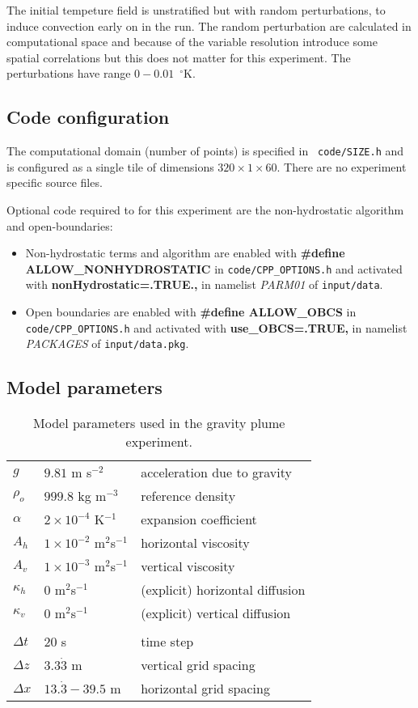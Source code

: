 The initial tempeture field is unstratified but with random
perturbations, to induce convection early on in the run. The random
perturbation are calculated in computational space and because of the
variable resolution introduce some spatial correlations but this does
not matter for this experiment. The perturbations have range
$0-0.01$~$^{\circ}\mathrm{K}$.

\subsection{Code configuration}
\label{www:tutorials}
\label{sect:plume-config}

The computational domain (number of points) is specified in {\tt
code/SIZE.h} and is configured as a single tile of dimensions
$320\times1\times60$. There are no experiment specific source files.

Optional code required to for this experiment are the non-hydrostatic
algorithm and open-boundaries:
\begin{itemize}
\item Non-hydrostatic terms and algorithm are enabled with {\bf
\#define ALLOW\_NONHYDROSTATIC} in {\tt code/CPP\_OPTIONS.h} and
activated with {\bf nonHydrostatic=.TRUE.,} in namelist {\em PARM01}
of {\tt input/data}.
\item Open boundaries are enabled with {\bf \#define ALLOW\_OBCS} in
{\tt code/CPP\_OPTIONS.h} and activated with {\bf use\_OBCS=.TRUE,} in
namelist {\em PACKAGES} of {\tt input/data.pkg}.
\end{itemize}

\subsection{Model parameters}
\label{www:tutorials}
\label{sect:plume-params}

\begin{table}
\begin{center}
\begin{tabular}{lll}
$g$ & $9.81$ m s$^{-2}$ & acceleration due to gravity \\
$\rho_o$ & $999.8$ kg m$^{-3}$ & reference density \\
$\alpha$ & $2 \times 10^{-4}$ K$^{-1}$ & expansion coefficient \\
$A_h$ & $1 \times 10^{-2}$ m$^2$s$^{-1}$ & horizontal viscosity \\
$A_v$ & $1 \times 10^{-3}$ m$^2$s$^{-1}$ & vertical viscosity \\
$\kappa_h$ & $0$ m$^2$s$^{-1}$ & (explicit) horizontal diffusion \\
$\kappa_v$ & $0$ m$^2$s$^{-1}$ & (explicit) vertical diffusion \\
\\
$\Delta t$ & $20$ s & time step \\
$\Delta z$ & $3.3\dot{3}$ m & vertical grid spacing \\
$\Delta x$ & $13.\dot{3}-39.5$ m & horizontal grid spacing
\end{tabular}
\end{center}
\caption{Model parameters used in the gravity plume experiment.}
\label{table:plume-on-slope}
\end{table}

